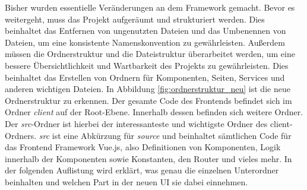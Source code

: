 Bisher wurden essentielle Veränderungen an dem Framework gemacht.
Bevor es weitergeht, muss das Projekt aufgeräumt und strukturiert werden.
Dies beinhaltet das Entfernen von ungenutzten Dateien und das Umbenennen von Dateien, um eine konsistente Namenskonvention zu gewährleisten.
Außerdem müssen die Ordnerstruktur und die Dateistruktur überarbeitet werden, um eine bessere Übersichtlichkeit und Wartbarkeit des Projekts zu gewährleisten.
Dies beinhaltet das Erstellen von Ordnern für Komponenten, Seiten, Services und anderen wichtigen Dateien.
In Abbildung \ref{fig:ordnerstruktur_neu} ist die neue Ordnerstruktur zu erkennen.
Der gesamte Code des Frontends befindet sich im Ordner \textit{client} auf der Root-Ebene.
Innerhalb dessen befinden sich weitere Ordner.
Der \textit{src}-Ordner ist hierbei der interessanteste und wichtigste Ordner des client-Ordners.
\textit{src} ist eine Abkürzung für \textit{source} und beinhaltet sämtlichen Code für das Frontend Framework Vue.js, also Definitionen von Komponenten, Logik innerhalb der Komponenten sowie Konstanten, den Router und vieles mehr.
In der folgenden Auflistung wird erklärt, was genau die einzelnen Unterordner beinhalten und welchen Part in der neuen UI sie dabei einnehmen.
